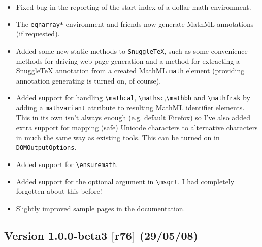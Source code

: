 \begin{itemize}
  \item Fixed bug in the reporting of the start index of a dollar math
  environment.

  \item The \verb|eqnarray*| environment and friends now generate MathML
  annotations (if requested).

  \item Added some new static methods to \verb|SnuggleTeX|, such as some
  convenience methods for driving web page generation and a method for
  extracting a SnuggleTeX annotation from a created MathML \verb|math| element
  (providing annotation generating is turned on, of course).

  \item Added support for handling \verb|\mathcal|,
  \verb|\mathsc|,\verb|\mathbb| and \verb|\mathfrak| by adding a
  \verb|mathvariant| attribute to resulting MathML identifier elements. This in
  its own isn't always enough (e.g. default Firefox) so I've also added extra
  support for mapping (safe) Unicode characters to alternative characters in
  much the same way as existing tools. This can be turned on in
  \verb|DOMOutputOptions|.

  \item Added support for \verb|\ensuremath|.

  \item Added support for the optional argument in \verb|\msqrt|. I had
  completely forgotten about this before!

  \item Slightly improved sample pages in the documentation.

\end{itemize}

\subsection*{Version 1.0.0-beta3 [r76] (29/05/08)}

